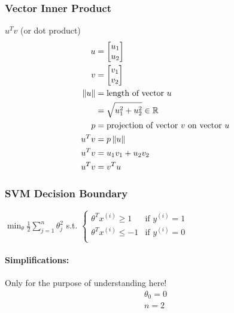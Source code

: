 \subsubsection{Vector Inner Product}
$u^Tv$ (or dot product)
\begin{align*}
	u        & = \begin{bmatrix}
		u_1 \\
		u_2 \\
	\end{bmatrix}                          \\
	v        & = \begin{bmatrix}
		v_1 \\
		v_2 \\
	\end{bmatrix}                          \\
	\left\Vert u \right\Vert & = \text{length of vector } u                          \\
	         & = \sqrt{u_1^2 + u_2^2} \in \mathbb{R}                         \\
	p        & = \text{projection of vector } v \text{ on vector } u \\
	u^Tv     & = p\left\Vert u \right\Vert                                           \\
	u^Tv     & = u_1v_1 + u_2v_2                                     \\
	u^Tv     & = v^Tu                                                \\
\end{align*}
\subsubsection{SVM Decision Boundary}
$\min_\theta \frac{1}{2}\sum_{j=1}^n\theta^2_j$ s.t. $\begin{cases}
		\theta^Tx^{(i)} \ge 1  & \text{if } y^{(i)} = 1 \\
		\theta^Tx^{(i)} \le -1 & \text{if } y^{(i)} = 0 \\
	\end{cases}$

\paragraph{Simplifications:} Only for the purpose of understanding here!
\begin{align*}
	\theta_0 = 0 \\
	n = 2        \\
\end{align*}

